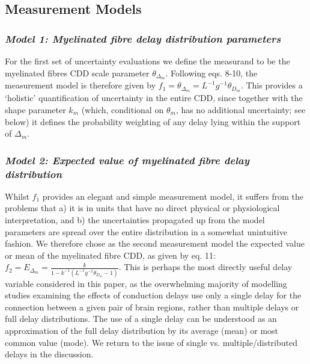 \subsection{Measurement Models}

\subsubsection*{\textit{Model 1: Myelinated fibre delay distribution parameters}}

For the first set of uncertainty evaluations we define the measurand to be the myelinated fibres CDD scale parameter $\theta_{\Delta_m}$. Following eqs. 8-10, the measurement model is therefore given by $f_{1} = \theta_{\Delta_m} = L^{-1} g^{-1} \theta_{D_m}$. This provides a
`holistic' quantification of uncertainty in the entire CDD, since together with the shape parameter $k_{m}$ (which, conditional on $\theta_{m}$, has no additional uncertainty; see below) it defines the probability weighting of any delay lying within the support of $\Delta_{m}$. 


\subsubsection*{\textit{Model 2: Expected value of myelinated fibre delay distribution}}

Whilst $f_{1}$ provides an elegant and simple measurement model, it suffers from the problems that a) it is in units that have no direct physical or physiological interpretation, and b) the uncertainties propagated up from the model parameters are spread over the entire distribution in a somewhat unintuitive fashion. We therefore chose as the second measurement model the expected value or mean of the myelinated fibre CDD, as given by eq. 11: $f_2 = E_{\Delta_m} = \frac{k}{1-  k^{-1} (L^{-1} g^{-1} \theta_{D_m} - 1)}$. This is perhaps the most directly useful delay variable considered in this paper, as the overwhelming majority of modelling studies examining the effects of conduction delays use only a single delay for the connection between a given pair of brain regions, rather than multiple delays or full delay distributions. The use of a single delay can be understood as an approximation of the full delay distribution by its average (mean) or most common value (mode). We return to the issue of single vs. multiple/distributed delays in the discussion. 



